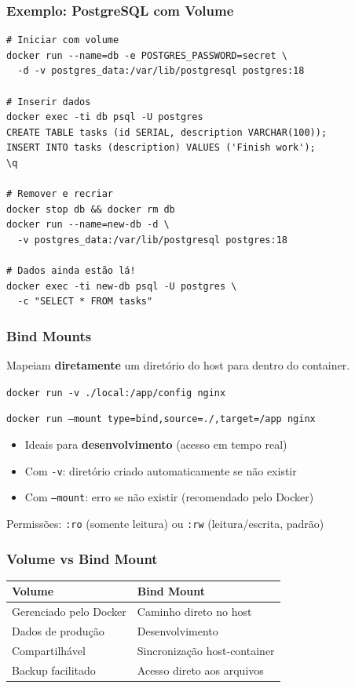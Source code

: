 \begin{frame}[fragile]
  \frametitle{Exemplo: PostgreSQL com Volume}
  \small
\begin{verbatim}
# Iniciar com volume
docker run --name=db -e POSTGRES_PASSWORD=secret \
  -d -v postgres_data:/var/lib/postgresql postgres:18

# Inserir dados
docker exec -ti db psql -U postgres
CREATE TABLE tasks (id SERIAL, description VARCHAR(100));
INSERT INTO tasks (description) VALUES ('Finish work');
\q

# Remover e recriar
docker stop db && docker rm db
docker run --name=new-db -d \
  -v postgres_data:/var/lib/postgresql postgres:18

# Dados ainda estão lá!
docker exec -ti new-db psql -U postgres \
  -c "SELECT * FROM tasks"
\end{verbatim}
\end{frame}

\begin{frame}
  \frametitle{Bind Mounts}
  Mapeiam \textbf{diretamente} um diretório do host para dentro do container.

  \vspace{0.5em}
  \texttt{docker run -v ./local:/app/config nginx}

  \vspace{0.3em}
  \texttt{docker run --mount type=bind,source=./,target=/app nginx}

  \vspace{0.8em}
  \begin{itemize}
    \item Ideais para \textbf{desenvolvimento} (acesso em tempo real)
    \item Com \texttt{-v}: diretório criado automaticamente se não existir
    \item Com \texttt{--mount}: erro se não existir (recomendado pelo Docker)
  \end{itemize}

  \vspace{0.5em}
  Permissões: \texttt{:ro} (somente leitura) ou \texttt{:rw} (leitura/escrita, padrão)
\end{frame}

\begin{frame}
  \frametitle{Volume vs Bind Mount}
  \begin{center}
  \begin{tabular}{|l|l|}
  \hline
  \textbf{Volume} & \textbf{Bind Mount} \\
  \hline
  Gerenciado pelo Docker & Caminho direto no host \\
  Dados de produção & Desenvolvimento \\
  Compartilhável & Sincronização host-container \\
  Backup facilitado & Acesso direto aos arquivos \\
  \hline
  \end{tabular}
  \end{center}
\end{frame}
